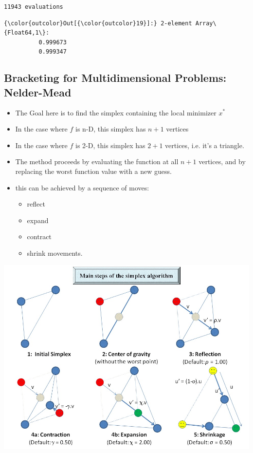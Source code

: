 \documentclass[11pt]{article}
\makeatletter
\def\maxwidth{\ifdim\Gin@nat@width>\linewidth\linewidth
    \else\Gin@nat@width\fi}
\let\Oldincludegraphics\includegraphics
\renewcommand{\includegraphics}[1]{\Oldincludegraphics[width=.8\maxwidth]{#1}}
\providecommand{\tightlist}{%
      \setlength{\itemsep}{0pt}\setlength{\parskip}{0pt}}
\makeatother
\begin{document}
    \begin{Verbatim}[commandchars=\\\{\}]
11943 evaluations

    \end{Verbatim}

\begin{Verbatim}[commandchars=\\\{\}]
{\color{outcolor}Out[{\color{outcolor}19}]:} 2-element Array\{Float64,1\}:
          0.999673
          0.999347
\end{Verbatim}
            
    \subsection{Bracketing for Multidimensional Problems:
Nelder-Mead}\label{bracketing-for-multidimensional-problems-nelder-mead}

\begin{itemize}
\tightlist
\item
  The Goal here is to find the simplex containing the local minimizer
  \(x^*\)
\item
  In the case where \(f\) is n-D, this simplex has \(n+1\) vertices
\item
  In the case where \(f\) is 2-D, this simplex has \(2+1\) vertices,
  i.e. it's a triangle.
\item
  The method proceeds by evaluating the function at all \(n+1\)
  vertices, and by replacing the worst function value with a new guess.
\item
  this can be achieved by a sequence of moves:

  \begin{itemize}
  \tightlist
  \item
    reflect
  \item
    expand
  \item
    contract
  \item
    shrink movements.
  \end{itemize}
\end{itemize}

    \includegraphics{../assets/figs/optimization/neldermeadsteps.jpg}
\end{document}
